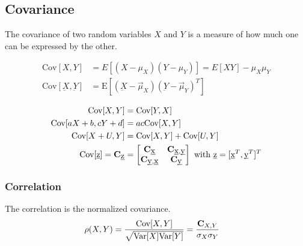 \begin{mdframed}[style=eqbox]
  \subsection{Covariance}
  The covariance of two random variables $X$ and $Y$ is a measure of how much one can be expressed by the other.
  \begin{mdframed}[style=redbox]
    \vspace*{-11pt}
    \begin{align*}
      \text{Cov}[X,Y] &= E[(X-\mu_X)(Y-\mu_Y)] = E[XY] - \mu_X\mu_Y\\
      \text{Cov}[\underbar{X},\underbar{Y}] &= \text{E}[(\underbar{X} - \vec{\mu}_X)(\underbar{Y} - \vec{\mu}_Y)^T]
    \end{align*}
  \end{mdframed}
  \vspace*{-9pt}\begin{align*}
    \text{Cov}[X,Y] &= \text{Cov}[Y,X]\\
    \text{Cov}[aX + b, cY + d] &= ac \text{Cov}[X,Y]\\
    \text{Cov}[X + U, Y] &= \text{Cov}[X,Y] + \text{Cov}[U,Y]\\
    \text{Cov}[\underbar{z}] = \mathbf{C}_{\underbar{z}} &= \begin{bmatrix}
      \mathbf{C}_{\underbar{x}} & \mathbf{C}_{\underbar{x},\underbar{y}}\\
      \mathbf{C}_{\underbar{y},\underbar{x}} & \mathbf{C}_{\underbar{y}}
    \end{bmatrix} \text{~with~} \underbar{z} = [\underbar{x}^T, \underbar{y}^T]^T
  \end{align*}
  \vspace*{-20pt}\subsubsection{Correlation}
  The correlation is the normalized covariance.
  \begin{align*}
    \rho(X,Y) &= \frac{\text{Cov}[X,Y]}{\sqrt{\text{Var}[X]\text{Var}[Y]}} = \frac{\mathbf{C}_{X,Y}}{\sigma_X \sigma_Y}
  \end{align*}
\end{mdframed}